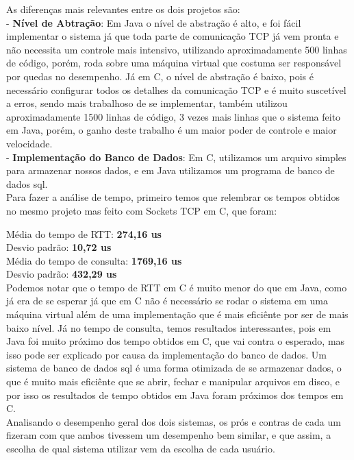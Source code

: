 \documentclass[11pt,twoside]{article}
\begin{document}
As diferenças mais relevantes entre os dois projetos são:\\
- \textbf{Nível de Abtração}: Em Java o nível de abstração é alto, e foi fácil implementar o sistema já que toda parte de comunicação TCP já vem pronta e não necessita um controle mais intensivo, utilizando aproximadamente 500 linhas de código, porém, roda sobre uma máquina virtual que costuma ser responsável por quedas no desempenho. Já em C, o nível de abstração é baixo, pois é necessário configurar todos os detalhes da comunicação TCP e é muito suscetível a erros, sendo mais trabalhoso de se implementar, também utilizou aproximadamente 1500 linhas de código, 3 vezes mais linhas que o sistema feito em Java, porém, o ganho deste trabalho é um maior poder de controle e maior velocidade.\\
- \textbf{Implementação do Banco de Dados}: Em C, utilizamos um arquivo simples para armazenar nossos dados, e em Java utilizamos um programa de banco de dados sql.\\
Para fazer a análise de tempo, primeiro temos que relembrar os tempos obtidos no mesmo projeto mas feito com Sockets TCP em C, que foram:

Média do tempo de RTT: \textbf{274,16 us}\\
Desvio padrão: \textbf{10,72 us}\\
Média do tempo de consulta: \textbf{1769,16 us}\\
Desvio padrão: \textbf{432,29 us}\\

Podemos notar que o tempo de RTT em C é muito menor do que em Java, como já era de se esperar já que em C não é necessário se rodar o sistema em uma máquina virtual além de uma implementação que é mais eficiênte por ser de mais baixo nível. Já no tempo de consulta, temos resultados interessantes, pois em Java foi muito próximo dos tempo obtidos em C, que vai contra o esperado, mas isso pode ser explicado por causa da implementação do banco de dados. Um sistema de banco de dados sql é uma forma otimizada de se armazenar dados, o que é muito mais eficiênte que se abrir, fechar e manipular arquivos em disco, e por isso os resultados de tempo obtidos em Java foram próximos dos tempos em C.\\
Analisando o desempenho geral dos dois sistemas, os prós e contras de cada um fizeram com que ambos tivessem um desempenho bem similar, e que assim, a escolha de qual sistema utilizar vem da escolha de cada usuário.\\ 
\end{document}
